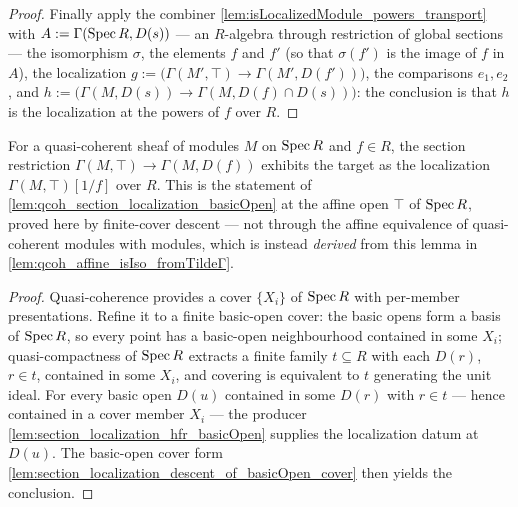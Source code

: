 \begin{proof}
  Finally apply the combiner \cref{lem:isLocalizedModule_powers_transport} with
  \(A := \Gamma(\operatorname{Spec} R, D(s))\) — an \(R\)-algebra through restriction of global
  sections — the isomorphism \(\sigma\), the elements \(f\) and \(f'\) (so that
  \(\sigma(f')\) is the image of \(f\) in \(A\)), the localization
  \(g := \bigl(\Gamma(M', \top) \to \Gamma(M', D(f'))\bigr)\), the comparisons
  \(e_1, e_2\), and \(h := \bigl(\Gamma(M, D(s)) \to \Gamma(M, D(f) \cap D(s))\bigr)\):
  the conclusion is that \(h\) is the localization at the powers of \(f\) over \(R\).
\end{proof}

\begin{lemma}
  \label{lem:section_localization_descent}
  \leanok
  For a quasi-coherent sheaf of modules \(M\) on \(\operatorname{Spec} R\) and \(f \in R\), the section
  restriction \(\Gamma(M, \top) \to \Gamma(M, D(f))\) exhibits the target as the
  localization \(\Gamma(M, \top)[1/f]\) over \(R\). This is the statement of
  \cref{lem:qcoh_section_localization_basicOpen} at the affine open \(\top\) of
  \(\operatorname{Spec} R\), proved here by finite-cover descent --- not through the affine
  equivalence of quasi-coherent modules with modules, which is instead \emph{derived}
  from this lemma in \cref{lem:qcoh_affine_isIso_fromTildeΓ}.
\end{lemma}
\begin{proof}
  \leanok
  Quasi-coherence provides a cover \(\{X_i\}\) of \(\operatorname{Spec} R\) with per-member
  presentations. Refine it to a finite basic-open cover: the basic opens form a basis of
  \(\operatorname{Spec} R\), so every point has a basic-open neighbourhood contained in some \(X_i\);
  quasi-compactness of \(\operatorname{Spec} R\) extracts a finite family \(t \subseteq R\) with each
  \(D(r)\), \(r \in t\), contained in some \(X_i\), and covering is equivalent to \(t\)
  generating the unit ideal. For every basic open \(D(u)\) contained in some \(D(r)\)
  with \(r \in t\) — hence contained in a cover member \(X_i\) — the producer
  \cref{lem:section_localization_hfr_basicOpen} supplies the localization datum at
  \(D(u)\). The basic-open cover form
  \cref{lem:section_localization_descent_of_basicOpen_cover} then yields the conclusion.
\end{proof}


